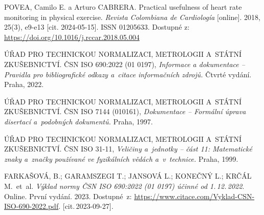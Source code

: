 \begin{thebibliography}{99}
		POVEA, Camilo E. a Arturo CABRERA.
		Practical usefulness of heart rate monitoring in physical exercise.
		\emph{Revista Colombiana de Cardiología} [online].
		2018, 25(3), e9-e13 [cit. 2024-05-15].
		ISSN 01205633.
		Dostupné z: \url{https://doi.org/10.1016/j.rccar.2018.05.004}


		ÚŘAD PRO TECHNICKOU NORMALIZACI, METROLOGII A~STÁTNÍ ZKUŠEBNICTVÍ.
		ČSN ISO 690:2022 (01 0197), \emph{Informace a dokumentace -- Pravidla pro bibliografické odkazy a~citace informačních zdrojů.}
		Čtvrté vydání. Praha, 2022.

		ÚŘAD PRO TECHNICKOU NORMALIZACI, METROLOGII A~STÁTNÍ ZKUŠEBNICTVÍ.
		ČSN ISO 7144 (010161), \emph{Dokumentace -- Formální úprava disertací a~podobných dokumentů.}
		Praha, 1997.

		ÚŘAD PRO TECHNICKOU NORMALIZACI, METROLOGII A~STÁTNÍ ZKUŠEBNICTVÍ.
		ČSN ISO 31-11, \emph{Veličiny a~jednotky -- část 11: Matematické znaky a~značky používané ve fyzikálních vědách a~v~technice.}
		Praha, 1999.

		FARKAŠOVÁ, B.; GARAMSZEGI T.; JANSOVÁ L.; KONEČNÝ L.; KRČÁL M.\ et~al.
		\emph{Výklad normy ČSN ISO 690:2022 (01 0197) účinné od 1.\,12.\,2022}.
		Online. První vydání. 2023.
		Dostupné~z:
		\url{https://www.citace.com/Vyklad-CSN-ISO-690-2022.pdf}.
		[cit.\,2023-09-27].

\end{thebibliography}


%
%
%
